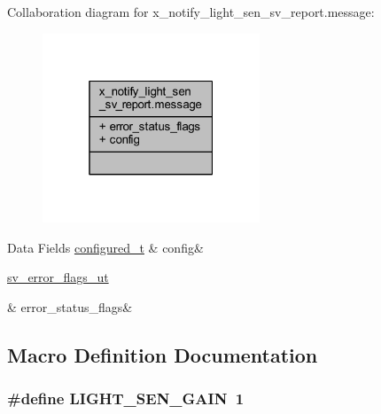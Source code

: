 Collaboration diagram for x\+\_\+notify\+\_\+light\+\_\+sen\+\_\+sv\+\_\+report.\+message\+:\nopagebreak
\begin{figure}[H]
\begin{center}
\leavevmode
\includegraphics[width=184pt]{d7/db6/a00940}
\end{center}
\end{figure}
\begin{DoxyFields}{Data Fields}
\hypertarget{a00018_a2245023265ae4cf87d02c8b6ba991139}{\hyperlink{a00021_d6/d9c/a00352}{configured\+\_\+t}}\label{a00018_a2245023265ae4cf87d02c8b6ba991139}
&
config&
\\
\hline

\hypertarget{a00018_a150dd23606edacb55873c2c2cd06807d}{\hyperlink{a00022_d2/d5a/a00792}{sv\+\_\+error\+\_\+flags\+\_\+ut}}\label{a00018_a150dd23606edacb55873c2c2cd06807d}
&
error\+\_\+status\+\_\+flags&
\\
\hline

\end{DoxyFields}


\subsection{Macro Definition Documentation}
\hypertarget{a00018_a67d542941eaade236c5f5a224efc7653}{
\subsubsection[{L\+I\+G\+H\+T\+\_\+\+S\+E\+N\+\_\+\+G\+A\+I\+N}]{\setlength{\rightskip}{0pt plus 5cm}\#define L\+I\+G\+H\+T\+\_\+\+S\+E\+N\+\_\+\+G\+A\+I\+N~1}}\label{a00018_a67d542941eaade236c5f5a224efc7653}


